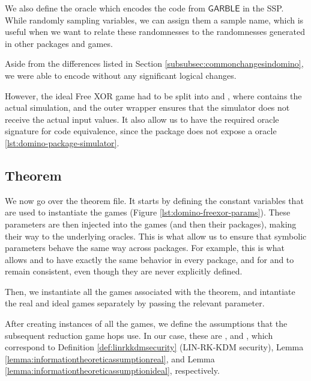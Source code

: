 

We also define the  oracle which encodes the code from $\mathsf{GARBLE}$ in the SSP. While randomly sampling variables, we can assign them a sample name, which is useful when we want to relate these randomnesses to the randomnesses generated in other packages and games. 

Aside from the differences listed in Section \ref{subsubsec:commonchangesindomino}, we were able to encode   without any significant logical changes. 

However, the ideal Free XOR game had to be split into  and , where  contains the actual simulation, and the outer wrapper ensures that the simulator does not receive the actual input values. It also allow us to have the required oracle signature for code equivalence, since the  package does not expose a  oracle \ref{lst:domino-package-simulator}.



\subsection{Theorem}
\label{subsec:encode_therorems}
We now go over the  theorem file. It starts by defining the constant variables that are used to instantiate the games (Figure \ref{lst:domino-freexor-params}). These parameters are then injected into the games (and then their packages), making their way to the underlying oracles. This is what allow us to ensure that symbolic parameters behave the same way across packages. For example, this is what allows  and  to have exactly the same behavior in every package, and for  and  to remain consistent, even though they are never explicitly defined.



Then, we instantiate all the games associated with the  theorem, and intantiate the real and ideal games separately by passing the relevant  parameter.



After creating instances of all the games, we define the assumptions that the subsequent reduction game hops use. In our case, these are ,  and , which correspond to Definition \ref{def:linrkkdmsecurity} (LIN-RK-KDM security), Lemma \ref{lemma:informationtheoreticassumptionreal}, and Lemma \ref{lemma:informationtheoreticassumptionideal}, respectively. 

